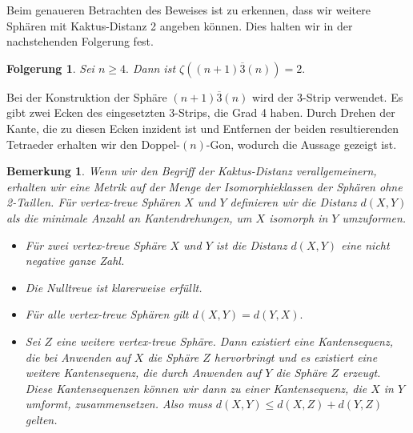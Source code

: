 \documentclass[12pt,titlepage,twoside,cleardoublepage]{article}
\theoremstyle{nummermitklammern}
\newtheorem{folgerung}[temp]{Folgerung}
\newtheorem{bemerkung}[temp]{Bemerkung}
\newtheorem{folgerung}[zahl]{Folgerung}
\newtheorem{bemerkung}[zahl]{Bemerkung}
\numberwithin{equation}{section}
\begin{document}
Beim genaueren Betrachten des Beweises ist zu erkennen, dass wir weitere Sphären mit Kaktus-Distanz 2 angeben können.
Dies halten wir in der nachstehenden Folgerung fest.
\begin{folgerung}
Sei $n\geq 4.$ Dann ist $\zeta ((n+1)\overline{3}(n))=2.$
\end{folgerung}
Bei der Konstruktion der Sphäre $(n+1)\overline{3}(n)$ wird der 3-Strip verwendet. Es gibt zwei Ecken des eingesetzten 3-Strips, die Grad 4 haben. Durch Drehen der Kante, die zu diesen Ecken inzident ist und Entfernen der beiden resultierenden Tetraeder erhalten wir den Doppel-$(n)$-Gon, wodurch die Aussage gezeigt ist.
\begin{bemerkung}
Wenn wir den Begriff der Kaktus-Distanz verallgemeinern, erhalten wir eine Metrik auf der Menge der Isomorphieklassen der Sphären ohne 2-Taillen. Für vertex-treue Sphären $X$ und $Y$ definieren wir die Distanz $d(X,Y)$ als die minimale Anzahl an Kantendrehungen, um $X$ isomorph in $Y$ umzuformen. 
\begin{itemize}
\item Für zwei vertex-treue Sphäre $X$ und $Y$ ist die Distanz $d(X,Y)$ eine nicht negative ganze Zahl.
\item Die Nulltreue ist klarerweise erfüllt.
\item Für alle vertex-treue Sphären gilt $d(X,Y)=d(Y,X).$
\item Sei $Z$ eine weitere vertex-treue Sphäre. Dann existiert eine Kantensequenz, die bei Anwenden auf $X$ die Sphäre $Z$ hervorbringt und es existiert eine weitere Kantensequenz, die durch Anwenden auf $Y$ die Sphäre $Z$ erzeugt. Diese Kantensequenzen können wir dann zu einer Kantensequenz, die $X$ in $Y$ umformt, zusammensetzen. Also muss $d(X,Y)\leq d(X,Z)+d(Y,Z)$ gelten.
\end{itemize}
\end{bemerkung}
\end{document}
